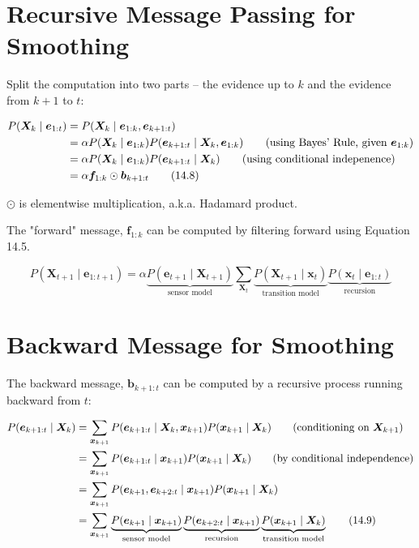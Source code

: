 \documentclass[11pt]{article}
\begin{document}
\section{Recursive Message Passing for Smoothing}
\label{sec:orgaa5f69a}

Split the computation into two parts -- the evidence up to \(k\) and the evidence from \(k + 1\) to \(t\):

\vspace{-.2in}
\begin{align*}
P(\bm{X}_{k} \mid \bm{e}_{1:t}) &= P(\bm{X}_{k} \mid \bm{e}_{1:k}, \bm{e}_{k+1:t}) \\
                                 &= \alpha P(\bm{X}_k \mid \bm{e}_{1:k}) P(\bm{e}_{k+1:t} \mid \bm{X}_k, \bm{e}_{1:k}) \tag{using Bayes' Rule, given $\bm{e}_{1:k}$} \\
                                 &= \alpha P(\bm{X}_k \mid \bm{e}_{1:k}) P(\bm{e}_{k+1:t} \mid \bm{X}_k) \tag{using conditional indepenence} \\
                                 &= \alpha \bm{f}_{1:k} \odot \bm{b}_{k+1:t} \tag{14.8}
\end{align*}

\(\odot\) is elementwise multiplication, a.k.a. Hadamard product.

The "forward" message, \(\bm{f}_{1:k}\) can be computed by filtering forward using Equation 14.5.

\[
P(\bm{X}_{t+1} \mid \bm{e}_{1:t+1}) = \alpha \underbrace{P(\bm{e}_{t+1} \mid \bm{X}_{t+1})}_{\text{sensor model}} \sum_{\bm{X}_t} \underbrace{P(\bm{X}_{t+1} \mid \bm{x}_t)}_{\text{transition model}} \underbrace{P(\bm{x}_t \mid \bm{e}_{1:t})}_{\text{recursion}} \tag{14.5}
\]
\section{Backward Message for Smoothing}
\label{sec:org989b45b}

The backward message, \(\bm{b}_{k+1:t}\) can be computed by a recursive process running backward from \(t\):

\vspace{-.2in}
\begin{align*}
P(\bm{e}_{k+1:t} \mid \bm{X}_k) &= \sum_{\bm{x}_{k+1}} P(\bm{e}_{k+1:t} \mid \bm{X}_k, \bm{x}_{k+1}) P(\bm{x}_{k+1} \mid \bm{X}_k) \tag{conditioning on $\bm{X}_{k+1}$} \\
                                 &= \sum_{\bm{x}_{k+1}} P(\bm{e}_{k+1:t} \mid \bm{x}_{k+1}) P(\bm{x}_{k+1} \mid \bm{X}_k) \tag{by conditional independence} \\
                                 &= \sum_{\bm{x}_{k+1}} P(\bm{e}_{k+1}, \bm{e}_{k+2:t} \mid \bm{x}_{k+1}) P(\bm{x}_{k+1} \mid \bm{X}_k) \\
                                 &= \sum_{\bm{x}_{k+1}} \underbrace{P(\bm{e}_{k+1} \mid \bm{x}_{k+1})}_{\text{sensor model}} \underbrace{P(\bm{e}_{k+2:t} \mid \bm{x}_{k+1})}_{\text{recursion}} \underbrace{P(\bm{x}_{k+1} \mid \bm{X}_k)}_{\text{transition model}} \tag{14.9}
\end{align*}
\end{document}

